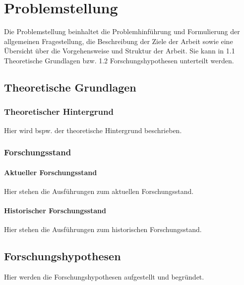 \chapter{Problemstellung}
Die Problemstellung beinhaltet die Problemhinführung und Formulierung der allgemeinen Fragestellung, die Beschreibung der Ziele der Arbeit sowie eine Übersicht über die Vorgehensweise und Struktur der Arbeit. Sie kann in 1.1 Theoretische Grundlagen bzw. 1.2 Forschungshypothesen unterteilt werden.
\section{Theoretische Grundlagen}
\subsection{Theoretischer Hintergrund}
Hier wird bspw. der theoretische Hintergrund beschrieben.

\subsection{Forschungsstand}
\subsubsection{Aktueller Forschungsstand}
Hier stehen die Ausführungen zum aktuellen Forschungsstand.

\subsubsection{Historischer Forschungsstand}
Hier stehen die Ausführungen zum historischen Forschungsstand.

\section{Forschungshypothesen}
Hier werden die Forschungshypothesen aufgestellt und begründet.